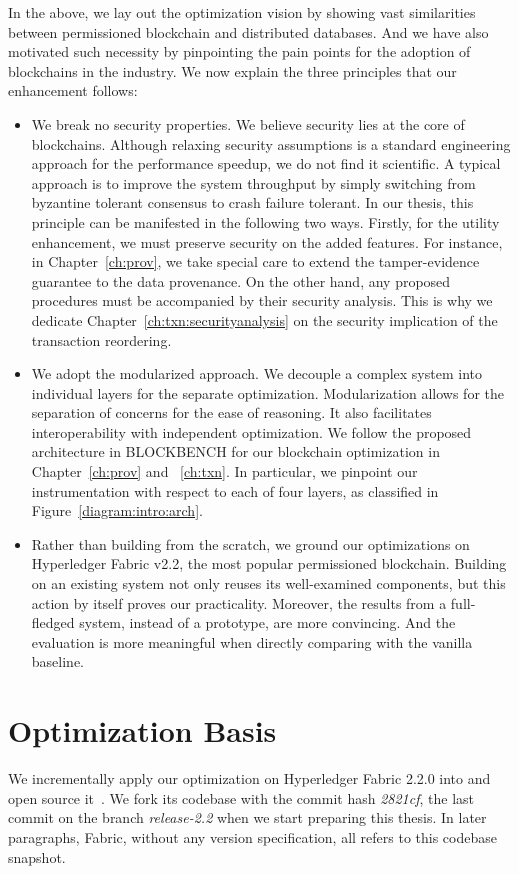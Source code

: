 In the above, we lay out the optimization vision by showing vast similarities between permissioned blockchain and distributed databases. 
And we have also motivated such necessity by pinpointing the pain points for the adoption of blockchains in the industry. 
We now explain the three principles that our enhancement follows:

\begin{itemize}
  \item We break no security properties. We believe security lies at the core of blockchains. Although relaxing security assumptions is a standard engineering approach for the performance speedup, we do not find it scientific. A typical approach is to improve the system throughput by simply switching from byzantine tolerant consensus to crash failure tolerant. In our thesis, this principle can be manifested in the following two ways. Firstly, for the utility enhancement, we must preserve security on the added features. For instance, in Chapter~\ref{ch:prov}, we take special care to extend the tamper-evidence guarantee to the data provenance. On the other hand, any proposed procedures must be accompanied by their security analysis. This is why we dedicate Chapter~\ref{ch:txn:securityanalysis} on the security implication of the transaction reordering. 
  \item We adopt the modularized approach. We decouple a complex system into individual layers for the separate optimization. Modularization allows for the separation of concerns for the ease of reasoning. It also facilitates interoperability with independent optimization. 
  We follow the proposed architecture in BLOCKBENCH for our blockchain optimization in Chapter~\ref{ch:prov} and ~\ref{ch:txn}. In particular, we pinpoint our instrumentation with respect to each of four layers, as classified in Figure~\ref{diagram:intro:arch}. 
  \item Rather than building from the scratch, we ground our optimizations on Hyperledger Fabric v2.2, the most popular permissioned blockchain. Building on an existing system not only reuses its well-examined components, but this action by itself proves our practicality. Moreover, the results from a full-fledged system, instead of a prototype, are more convincing. And the evaluation is more meaningful when directly comparing with the vanilla baseline. 
\end{itemize}

\section{Optimization Basis}
\label{ch:intro:basis}
We incrementally apply our optimization on Hyperledger Fabric 2.2.0 into {\fs} and open source it~\cite{fsharp}. We fork its codebase with the commit hash \textit{2821cf}, the last commit on the branch \textit{release-2.2} when we start preparing this thesis. In later paragraphs, Fabric, without any version specification, all refers to this codebase snapshot. 

